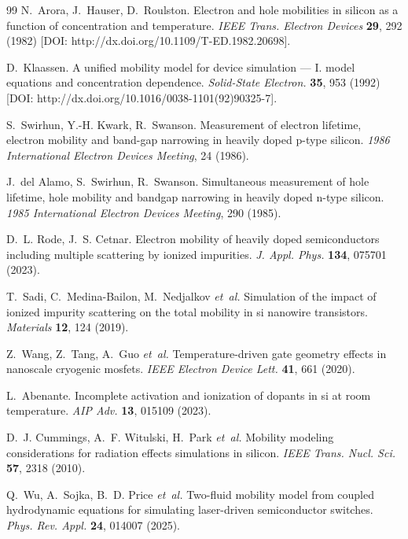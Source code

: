 \documentclass[fleqn,twoside,twocolumn,nofootinbib,showkeys]{revtex4} %
\begin{document}
\begin{thebibliography}{99}
N.~Arora, J.~Hauser, D.~Roulston. Electron and hole mobilities in silicon as a function of concentration and temperature. \textit{IEEE Trans. Electron Devices} \textbf{29}, 292 (1982) [DOI: http://dx.doi.org/10.1109/T-ED.1982.20698].

D.~Klaassen. A unified mobility model for device simulation --- I. model equations and concentration dependence. \textit{Solid-State Electron.} \textbf{35}, 953 (1992) [DOI: http://dx.doi.org/10.1016/0038-1101(92)90325-7].


S.~Swirhun, Y.-H. Kwark, R.~Swanson. Measurement of electron lifetime, electron mobility and band-gap narrowing in heavily doped p-type silicon. \textit{1986 International Electron Devices Meeting}, 24 (1986).

J.~del Alamo, S.~Swirhun, R.~Swanson. Simultaneous measurement of hole lifetime, hole mobility and bandgap narrowing in heavily doped n-type silicon. \textit{1985 International Electron Devices Meeting}, 290 (1985).

D.~L. Rode, J.~S. Cetnar. Electron mobility of heavily doped semiconductors including multiple scattering by ionized impurities. \textit{J. Appl. Phys.} \textbf{134}, 075701 (2023).

T.~Sadi, C.~Medina-Bailon, M.~Nedjalkov \textit{et~al.} Simulation of the impact of ionized impurity scattering on the total mobility in si nanowire transistors. \textit{Materials} \textbf{12}, 124 (2019).

Z.~Wang, Z.~Tang, A.~Guo \textit{et~al.} Temperature-driven gate geometry effects in nanoscale cryogenic mosfets. \textit{IEEE Electron Device Lett.} \textbf{41}, 661 (2020).

L.~Abenante. Incomplete activation and ionization of dopants in si at room temperature. \textit{AIP Adv.} \textbf{13}, 015109 (2023).

D.~J. Cummings, A.~F. Witulski, H.~Park \textit{et~al.} Mobility modeling considerations for radiation effects simulations in silicon. \textit{IEEE Trans. Nucl. Sci.} \textbf{57}, 2318 (2010).

Q.~Wu, A.~Sojka, B.~D. Price \textit{et~al.} Two-fluid mobility model from coupled hydrodynamic equations for simulating laser-driven semiconductor switches. \textit{Phys. Rev. Appl.} \textbf{24}, 014007 (2025).


\end{thebibliography}
\end{document}
